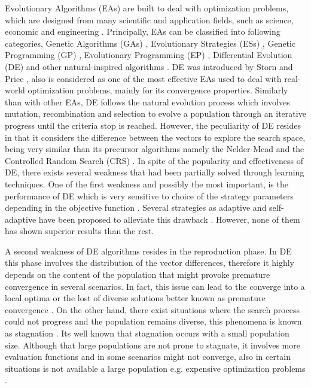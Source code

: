 Evolutionary Algorithms (EAs) are built to deal with optimization problems, which are designed from many scientific and application fields, such as science, economic and engineering \cite{noman2008differential, chakraborty2008advances}.
%
Principally, EAs can be classified into following categories, Genetic Algorithms (GAs) \cite{srinivas1994genetic, schwefel1977numerische} , Evolutionary Strategies (ESs) \cite{john1992holland}, Genetic Programming (GP) \cite{koza1992genetic}, Evolutionary Programming (EP) \cite{fogel1991meta}, Differential Evolution (DE) \cite{storn1997differential} and other natural-inspired algorithms \cite{das2011differential}.
%
%
DE was introduced by Storn and Price \cite{storn1997differential}, also is considered as one of the most effective EAs used to deal with real-world optimization problems, mainly for its convergence properties.
%
Similarly than with other EAs, DE follows the natural evolution process which involves mutation, recombination and selection to evolve a population through an iterative progress until the criteria stop is reached.
%
However, the peculiarity of DE resides in that it considers the difference between the vectors to explore the search space, being very similar than its precursor algorithms namely the Nelder-Mead \cite{nelder1965simplex} and the Controlled Random Search (CRS) \cite{price1983global}.
%
In spite of the popularity and effectiveness of DE, there exists several weakness that had been partially solved through learning techniques.
%
One of the first weakness and possibly the most important, is the performance of DE which is very sensitive to choice of the strategy parameters depending in the objective function \cite{gamperle2002parameter}.
%
Several strategies as adaptive and self-adaptive have been proposed to alleviate this drawback \cite{brest2006self, zhang2009jade}.
%
However, none of them has shown superior results than the rest.
%

A second weakness of DE algorithms resides in the reproduction phase.
%
In DE this phase involves the distribution of the vector differences, therefore it highly depends on the content of the population that might provoke premature convergence in several scenarios.
%
In fact, this issue can lead to the converge into a local optima or the lost of diverse solutions better known as premature convergence \cite{sa2008exploration}.
%
On the other hand, there exist situations where the search process could not progress and the population remains diverse, this phenomena is known as stagnation \cite{lampinen2000stagnation}.
%
Its well known that stagnation occurs with a small population size.
%
Although that large populations are not prone to stagnate, it involves more evaluation functions and in some scenarios might not converge, also in certain situations is not available a large population e.g. expensive optimization problems \cite{chen2014problem}.

